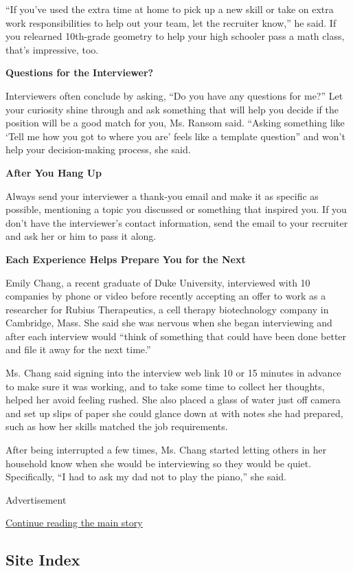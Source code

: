 ``If you've used the extra time at home to pick up a new skill or take
on extra work responsibilities to help out your team, let the recruiter
know,'' he said. If you relearned 10th-grade geometry to help your high
schooler pass a math class, that's impressive, too.

\textbf{Questions for the Interviewer?}

Interviewers often conclude by asking, ``Do you have any questions for
me?'' Let your curiosity shine through and ask something that will help
you decide if the position will be a good match for you, Ms. Ransom
said. ``Asking something like `Tell me how you got to where you are'
feels like a template question'' and won't help your decision-making
process, she said.

\textbf{After You Hang Up}

Always send your interviewer a thank-you email and make it as specific
as possible, mentioning a topic you discussed or something that inspired
you. If you don't have the interviewer's contact information, send the
email to your recruiter and ask her or him to pass it along.

\textbf{Each Experience Helps Prepare You for the Next}

Emily Chang, a recent graduate of Duke University, interviewed with 10
companies by phone or video before recently accepting an offer to work
as a researcher for Rubius Therapeutics, a cell therapy biotechnology
company in Cambridge, Mass. She said she was nervous when she began
interviewing and after each interview would ``think of something that
could have been done better and file it away for the next time.''

Ms. Chang said signing into the interview web link 10 or 15 minutes in
advance to make sure it was working, and to take some time to collect
her thoughts, helped her avoid feeling rushed. She also placed a glass
of water just off camera and set up slips of paper she could glance down
at with notes she had prepared, such as how her skills matched the job
requirements.

After being interrupted a few times, Ms. Chang started letting others in
her household know when she would be interviewing so they would be
quiet. Specifically, ``I had to ask my dad not to play the piano,'' she
said.

Advertisement

\protect\hyperlink{after-bottom}{Continue reading the main story}

\hypertarget{site-index}{%
\subsection{Site Index}\label{site-index}}

